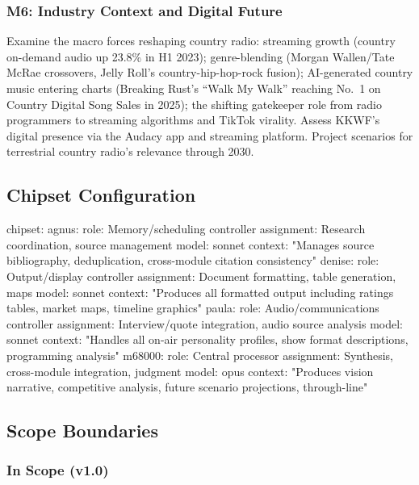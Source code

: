 \documentclass[11pt,letterpaper]{article}
\begin{document}
\subsubsection{M6: Industry Context and Digital Future}

Examine the macro forces reshaping country radio: streaming growth (country on-demand audio up 23.8\% in H1 2023); genre-blending (Morgan Wallen/Tate McRae crossovers, Jelly Roll's country-hip-hop-rock fusion); AI-generated country music entering charts (Breaking Rust's ``Walk My Walk'' reaching No.~1 on Country Digital Song Sales in 2025); the shifting gatekeeper role from radio programmers to streaming algorithms and TikTok virality. Assess KKWF's digital presence via the Audacy app and streaming platform. Project scenarios for terrestrial country radio's relevance through 2030.

\subsection{Chipset Configuration}

\begin{asciibox}
chipset:
  agnus:
    role: Memory/scheduling controller
    assignment: Research coordination, source management
    model: sonnet
    context: "Manages source bibliography, deduplication,
              cross-module citation consistency"
  denise:
    role: Output/display controller
    assignment: Document formatting, table generation, maps
    model: sonnet
    context: "Produces all formatted output including ratings
              tables, market maps, timeline graphics"
  paula:
    role: Audio/communications controller
    assignment: Interview/quote integration, audio source analysis
    model: sonnet
    context: "Handles all on-air personality profiles, show
              format descriptions, programming analysis"
  m68000:
    role: Central processor
    assignment: Synthesis, cross-module integration, judgment
    model: opus
    context: "Produces vision narrative, competitive analysis,
              future scenario projections, through-line"
\end{asciibox}

\subsection{Scope Boundaries}

\subsubsection*{In Scope (v1.0)}
\end{document}
